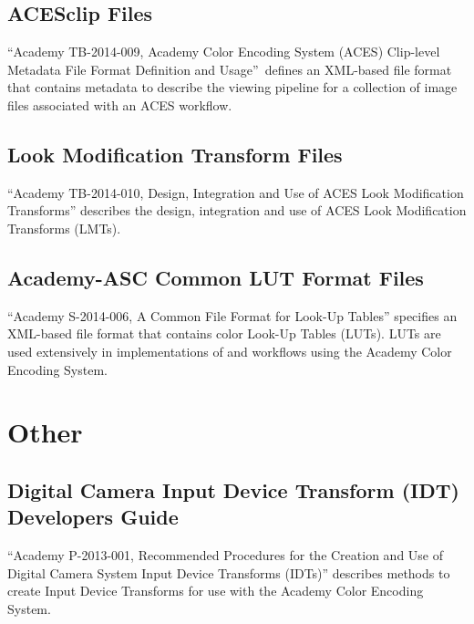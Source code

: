 \subsection{ACESclip Files}
``Academy TB-2014-009, Academy Color Encoding System (ACES) Clip-level Metadata File Format Definition and Usage'' defines an XML-based file format that contains metadata to describe the viewing pipeline for a collection of image files associated with an ACES workflow.

\subsection{Look Modification Transform Files}
``Academy TB-2014-010, Design, Integration and Use of ACES Look Modification Transforms'' describes the design, integration and use of ACES Look Modification Transforms (LMTs).

\subsection{Academy-ASC Common LUT Format Files}
``Academy S-2014-006, A Common File Format for Look-Up Tables'' specifies an XML-based file format that contains color Look-Up Tables (LUTs). LUTs are used extensively in implementations of and workflows using the Academy Color Encoding System.


\section{Other}
\subsection{Digital Camera Input Device Transform (IDT) Developers Guide}
``Academy P-2013-001, Recommended Procedures for the Creation and Use of Digital Camera System Input Device Transforms (IDTs)'' describes methods to create Input Device Transforms for use with the Academy Color Encoding System.